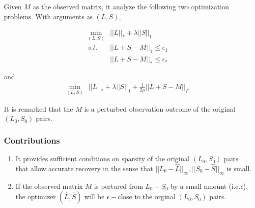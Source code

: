 Given $M$ as the observed matrix, it analyze the following two optimization problems. With arguments as $(L,S)$,

\begin{eqnarray}
\min_{(L,S)} & ||L||_{*}+\lambda||S||_{1}\nonumber \\
s.t. & ||L+S-M||_{1}\le\epsilon_{1}\\
 & ||L+S-M||_{*}\le\epsilon_{*}\nonumber
\end{eqnarray}


and
\begin{eqnarray}
\min_{(L,S)} & ||L||_{*}+\lambda||S||_{1}+\frac{1}{2\mu}||L+S-M||_{F}
\end{eqnarray}


It is remarked that the $M$ is a perturbed observation outcome of the original $(L_{0},S_{0})$ pairs.


\subsubsection{Contributions}
\begin{enumerate}
\item It provides sufficient conditions on sparsity of the original $(L_{0},S_{0})$ pairs that allow accurate recovery in the sense that $||L_{0}-\hat{L}||_{\infty},||S_{0}-\hat{S}||_{\infty}$ is small.
\item If the observed matrix $M$ is pertured from $L_{0}+S_{0}$ by a small amount (i.e.$\epsilon$), the optimizer $(\hat{L}, \hat{S})$ will be $\epsilon-$close to the orginal $(L_{0},S_{0})$ pairs.
\end{enumerate}
